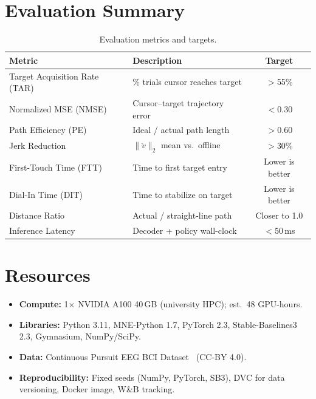 \documentclass[11pt]{article}
\begin{document}
\section{Evaluation Summary}

\begin{table}[h]
\centering
\caption{Evaluation metrics and targets.}
\begin{tabular}{@{}llc@{}}
\toprule
\textbf{Metric} & \textbf{Description} & \textbf{Target} \\
\midrule
Target Acquisition Rate (TAR) & \% trials cursor reaches target & $>$55\% \\
Normalized MSE (NMSE) & Cursor--target trajectory error & $<$0.30 \\
Path Efficiency (PE) & Ideal / actual path length & $>$0.60 \\
Jerk Reduction & $\|\ddot{v}\|_2$ mean vs.\ offline & $>$30\% \\
First-Touch Time (FTT) & Time to first target entry & Lower is better \\
Dial-In Time (DIT) & Time to stabilize on target & Lower is better \\
Distance Ratio & Actual / straight-line path & Closer to 1.0 \\
Inference Latency & Decoder + policy wall-clock & $<$50\,ms \\
\bottomrule
\end{tabular}
\end{table}

\section{Resources}

\begin{itemize}[leftmargin=*,nosep]
    \item \textbf{Compute:} 1$\times$ NVIDIA A100 40\,GB (university HPC); est.\ 48 GPU-hours.
    \item \textbf{Libraries:} Python 3.11, MNE-Python 1.7, PyTorch 2.3, Stable-Baselines3 2.3, Gymnasium, NumPy/SciPy.
    \item \textbf{Data:} Continuous Pursuit EEG BCI Dataset~\cite{korik2024} (CC-BY 4.0).
    \item \textbf{Reproducibility:} Fixed seeds (NumPy, PyTorch, SB3), DVC for data versioning, Docker image, W\&B tracking.
\end{itemize}
\end{document}
